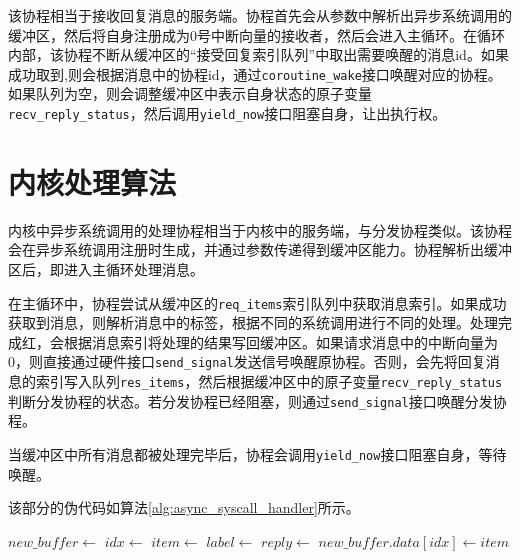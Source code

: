 该协程相当于接收回复消息的服务端。协程首先会从参数中解析出异步系统调用的缓冲区，然后将自身注册成为0号中断向量的接收者，然后会进入主循环。在循环内部，该协程不断从缓冲区的“接受回复索引队列”中取出需要唤醒的消息id。如果成功取到,则会根据消息中的协程id，通过\texttt{coroutine\_wake}接口唤醒对应的协程。如果队列为空，则会调整缓冲区中表示自身状态的原子变量
\texttt{recv\_reply\_status}，然后调用\texttt{yield\_now}接口阻塞自身，让出执行权。

\section{内核处理算法}

内核中异步系统调用的处理协程相当于内核中的服务端，与分发协程类似。该协程会在异步系统调用注册时生成，并通过参数传递得到缓冲区能力。协程解析出缓冲区后，即进入主循环处理消息。

在主循环中，协程尝试从缓冲区的\texttt{req\_items}索引队列中获取消息索引。如果成功获取到消息，则解析消息中的标签，根据不同的系统调用进行不同的处理。处理完成红，会根据消息索引将处理的结果写回缓冲区。如果请求消息中的中断向量为0，则直接通过硬件接口\texttt{send\_signal}发送信号唤醒原协程。否则，会先将回复消息的索引写入队列\texttt{res\_items}，然后根据缓冲区中的原子变量\texttt{recv\_reply\_status}判断分发协程的状态。若分发协程已经阻塞，则通过\texttt{send\_signal}接口唤醒分发协程。

当缓冲区中所有消息都被处理完毕后，协程会调用\texttt{yield\_now}接口阻塞自身，等待唤醒。

该部分的伪代码如算法\ref*{alg:async_syscall_handler}所示。

\begin{algorithm}[h]
  \caption{异步系统调用处理协程 \texttt{async\_syscall\_handler}}\label{alg:async_syscall_handler}
\begin{algorithmic}
    \State $new\_buffer \gets$ 
    \Loop
            \State $idx \gets$ 
            \State $item \gets$ 
            \State $label \gets$ 
            \State {}
            \State $reply \gets$ 
            \State $new\_buffer.data[idx] \gets item$
                \State {}
            \Else
                \State {}
                    \State {}
                    \State {}
                \EndIf
            \EndIf
        \Else
            \State {}
            \State {} 
        \EndIf
    \EndLoop
\EndFunction
\end{algorithmic}
\end{algorithm}



